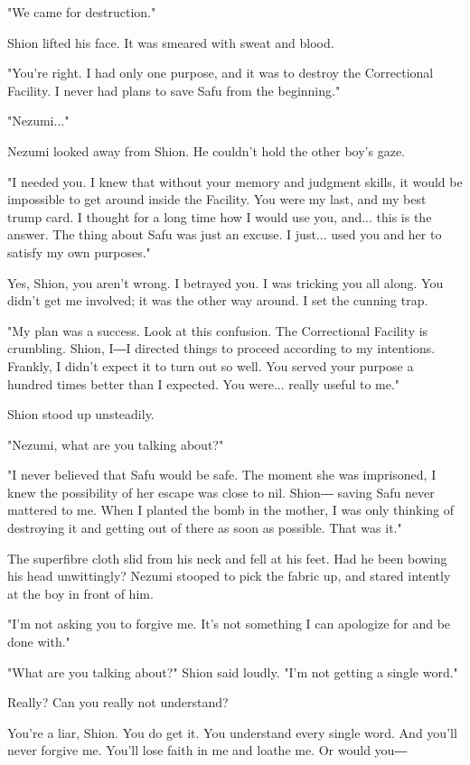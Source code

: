 "We came for destruction."

Shion lifted his face. It was smeared with sweat and blood.

"You're right. I had only one purpose, and it was to destroy the
Correctional Facility. I never had plans to save Safu from the
beginning."

"Nezumi..."

Nezumi looked away from Shion. He couldn't hold the other boy's gaze.

"I needed you. I knew that without your memory and judgment skills, it
would be impossible to get around inside the Facility. You were my last,
and my best trump card. I thought for a long time how I would use you,
and... this is the answer. The thing about Safu was just an excuse. I
just... used you and her to satisfy my own purposes."

Yes, Shion, you aren't wrong. I betrayed you. I was tricking you all
along. You didn't get me involved; it was the other way around. I set
the cunning trap.

"My plan was a success. Look at this confusion. The Correctional
Facility is crumbling. Shion, I―I directed things to proceed according
to my intentions. Frankly, I didn't expect it to turn out so well. You
served your purpose a hundred times better than I expected. You were...
really useful to me."

Shion stood up unsteadily.

"Nezumi, what are you talking about?"

"I never believed that Safu would be safe. The moment she was
imprisoned, I knew the possibility of her escape was close to nil.
Shion― saving Safu never mattered to me. When I planted the bomb in the
mother, I was only thinking of destroying it and getting out of there as
soon as possible. That was it."

The superfibre cloth slid from his neck and fell at his feet. Had he
been bowing his head unwittingly? Nezumi stooped to pick the fabric up,
and stared intently at the boy in front of him.

"I'm not asking you to forgive me. It's not something I can apologize
for and be done with."

"What are you talking about?" Shion said loudly. "I'm not getting a
single word."

Really? Can you really not understand?

You're a liar, Shion. You do get it. You understand every single word.
And you'll never forgive me. You'll lose faith in me and loathe me. Or
would you―

